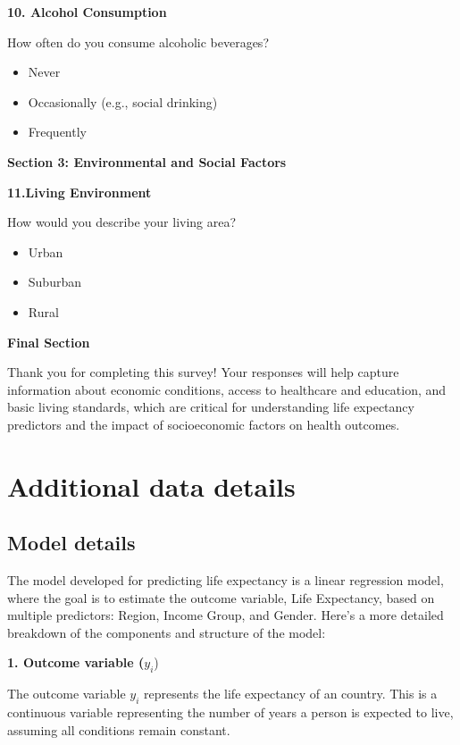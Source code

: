 \documentclass[
  letterpaper,
  DIV=11,
  numbers=noendperiod]{scrartcl}
\providecommand{\tightlist}{%
  \setlength{\itemsep}{0pt}\setlength{\parskip}{0pt}}\usepackage{longtable,booktabs,array}
\begin{document}
\textbf{10. Alcohol Consumption}

How often do you consume alcoholic beverages?

\begin{itemize}
\tightlist
\item
  Never
\item
  Occasionally (e.g., social drinking)
\item
  Frequently
\end{itemize}

\textbf{Section 3: Environmental and Social Factors}

\textbf{11.Living Environment}

How would you describe your living area?

\begin{itemize}
\tightlist
\item
  Urban
\item
  Suburban
\item
  Rural
\end{itemize}

\textbf{Final Section}

Thank you for completing this survey! Your responses will help capture
information about economic conditions, access to healthcare and
education, and basic living standards, which are critical for
understanding life expectancy predictors and the impact of socioeconomic
factors on health outcomes.

\section{Additional data details}\label{additional-data-details}

\subsection{Model details}\label{sec-model-details}

The model developed for predicting life expectancy is a linear
regression model, where the goal is to estimate the outcome variable,
Life Expectancy, based on multiple predictors: Region, Income Group, and
Gender. Here's a more detailed breakdown of the components and structure
of the model:

\textbf{1. Outcome variable (}\(y_i\))

The outcome variable \(y_i\) represents the life expectancy of an
country. This is a continuous variable representing the number of years
a person is expected to live, assuming all conditions remain constant.
\end{document}
